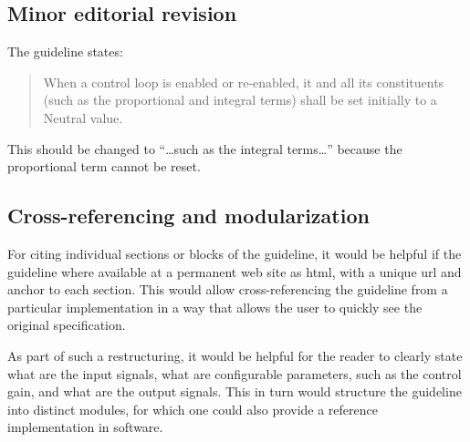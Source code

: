 \documentclass[letterpaper,10pt, openany,english]{sphinxmanual}
\begin{document}
\subsection{Minor editorial revision}
\label{\detokenize{example:minor-editorial-revision}}
The guideline states:
\begin{quote}

When a control loop is enabled or re-enabled, it and all its constituents (such as the
proportional and integral terms) shall be set initially to a Neutral value.
\end{quote}

This should be changed to “…such as the integral terms…” because the
proportional term cannot be reset.


\subsection{Cross-referencing and modularization}
\label{\detokenize{example:cross-referencing-and-modularization}}
For citing individual sections or blocks of the guideline,
it would be helpful if the guideline where available at a permanent web site
as html, with a unique url and anchor to each section.
This would allow cross-referencing the guideline from a particular implementation
in a way that allows the user to quickly see the original specification.

As part of such a restructuring, it would be helpful for the reader
to clearly state what are the input signals, what are configurable parameters,
such as the control gain, and what are the output signals.
This in turn would structure the guideline into distinct modules,
for which one could also provide a reference implementation
in software.
\end{document}

